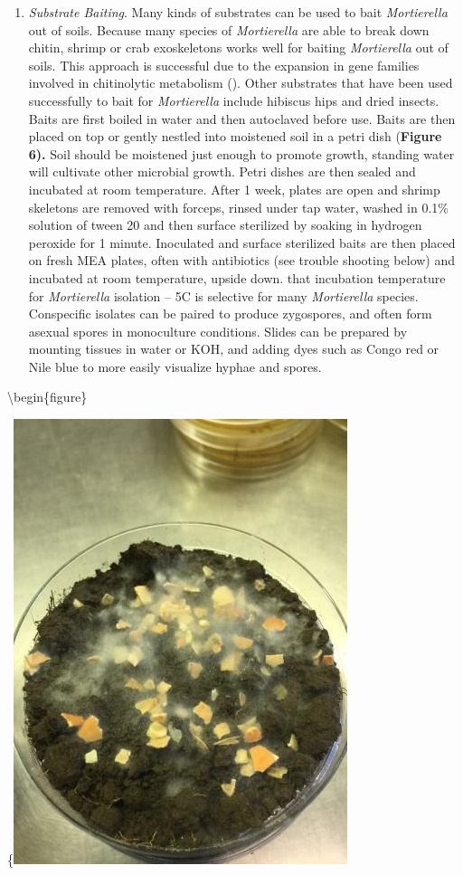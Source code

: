 \documentclass[]{book}
\providecommand{\tightlist}{%
  \setlength{\itemsep}{0pt}\setlength{\parskip}{0pt}}
\begin{document}
\begin{enumerate}
\def\labelenumi{\arabic{enumi}.}
\tightlist
\item
  \emph{Substrate Baiting}. Many kinds of substrates can be used to bait \emph{Mortierella} out of soils. Because many species of \emph{Mortierella} are able to break down chitin, shrimp or crab exoskeletons works well for baiting \emph{Mortierella} out of soils. This approach is successful due to the expansion in gene families involved in chitinolytic metabolism (\citet{Uehling_2017}). Other substrates that have been used successfully to bait for \emph{Mortierella} include hibiscus hips and dried insects. Baits are first boiled in water and then autoclaved before use. Baits are then placed on top or gently nestled into moistened soil in a petri dish (\textbf{Figure 6).} Soil should be moistened just enough to promote growth, standing water will cultivate other microbial growth. Petri dishes are then sealed and incubated at room temperature. After 1 week, plates are open and shrimp skeletons are removed with forceps, rinsed under tap water, washed in 0.1\% solution of tween 20 and then surface sterilized by soaking in hydrogen peroxide for 1 minute. Inoculated and surface sterilized baits are then placed on fresh MEA plates, often with antibiotics (see trouble shooting below) and incubated at room temperature, upside down. that incubation temperature for \emph{Mortierella} isolation -- 5C is selective for many \emph{Mortierella} species. Conspecific isolates can be paired to produce zygospores, and often form asexual spores in monoculture conditions. Slides can be prepared by mounting tissues in water or KOH, and adding dyes such as Congo red or Nile blue to more easily visualize hyphae and spores.
\end{enumerate}

\textbackslash begin\{figure\}

\{\centering \includegraphics{img/Ch8_Fig6}
\end{document}
